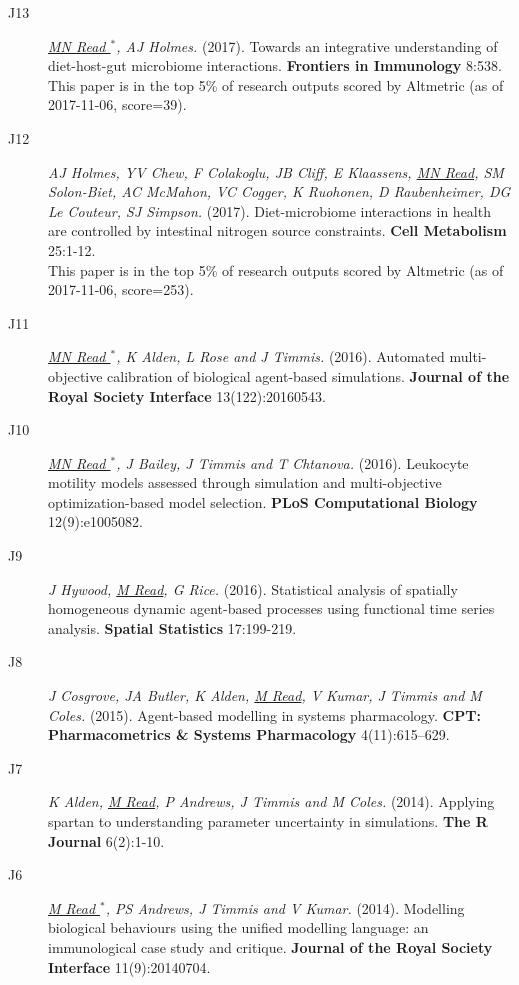 \documentclass[a4paper]{article}
\begin{document}
\begin{description}
\item[J13]
\textit{\underline{MN Read $^{*}$}, AJ Holmes.}
(2017).
Towards an integrative understanding of diet-host-gut microbiome interactions.
\textbf{Frontiers in Immunology} 8:538.\\
This paper is in the top 5\% of research outputs scored by Altmetric (as of 2017-11-06, score=39).

\item[J12]
\textit{AJ Holmes, YV Chew, F Colakoglu, JB Cliff, E Klaassens, \underline{MN Read}, SM Solon-Biet, AC McMahon, VC Cogger, K Ruohonen, D Raubenheimer, DG Le Couteur, SJ Simpson.}
(2017).
Diet-microbiome interactions in health are controlled by intestinal nitrogen source constraints.
\textbf{Cell Metabolism} 25:1-12.\\
This paper is in the top 5\% of research outputs scored by Altmetric (as of 2017-11-06, score=253).

\item[J11]
\textit{\underline{MN Read $^{*}$}, K Alden, L Rose and J Timmis.}
(2016).
Automated multi-objective calibration of biological agent-based simulations.
\textbf{Journal of the Royal Society Interface} 13(122):20160543.

\item[J10]
\textit{\underline{MN Read $^{*}$}, J Bailey, J Timmis and T Chtanova.}
(2016).
Leukocyte motility models assessed through simulation and multi-objective optimization-based model selection.
\textbf{PLoS Computational Biology} 12(9):e1005082.

\item[J9]
\textit{J Hywood, \underline{M Read}, G Rice.}
(2016).
Statistical analysis of spatially homogeneous dynamic agent-based processes using functional time series analysis.
\textbf{Spatial Statistics} 17:199-219.

\item[J8]
\textit{J Cosgrove, JA Butler, K Alden, \underline{M Read}, V Kumar, J Timmis and M Coles.}
(2015).
Agent-based modelling in systems pharmacology.
\textbf{CPT: Pharmacometrics \& Systems Pharmacology} 4(11):615–629.

\item[J7]
\textit{K Alden, \underline{M Read}, P Andrews, J Timmis and M Coles.}
(2014).
Applying spartan to understanding parameter uncertainty in simulations.
\textbf{The R Journal} 6(2):1-10.

\item[J6]
\textit{\underline{M Read $^{*}$}, PS Andrews, J Timmis and V Kumar.}
(2014).
Modelling biological behaviours using the unified modelling language: an immunological case study and critique.
\textbf{Journal of the Royal Society Interface} 11(9):20140704.


\end{description}
\end{document}
